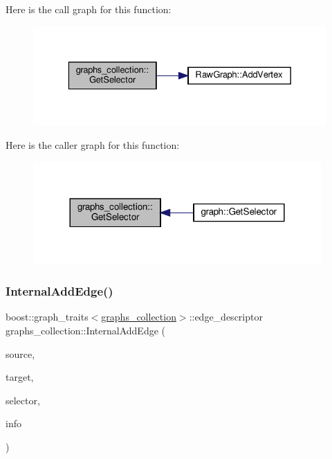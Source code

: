 Here is the call graph for this function\+:
\nopagebreak
\begin{figure}[H]
\begin{center}
\leavevmode
\includegraphics[width=329pt]{d8/d8d/structgraphs__collection_a99d8a722a7c4690f13a3a026f452c6c6_cgraph}
\end{center}
\end{figure}
Here is the caller graph for this function\+:
\nopagebreak
\begin{figure}[H]
\begin{center}
\leavevmode
\includegraphics[width=312pt]{d8/d8d/structgraphs__collection_a99d8a722a7c4690f13a3a026f452c6c6_icgraph}
\end{center}
\end{figure}
\mbox{\label{structgraphs__collection_a93b6975b6ecad6fa56ff112eaeb39270}} 
\subsubsection{\texorpdfstring{Internal\+Add\+Edge()}{InternalAddEdge()}}
{\footnotesize\ttfamily boost\+::graph\+\_\+traits$<$\hyperlink{structgraphs__collection}{graphs\+\_\+collection}$>$\+::edge\+\_\+descriptor graphs\+\_\+collection\+::\+Internal\+Add\+Edge (\begin{DoxyParamCaption}\item[{boost\+::graph\+\_\+traits$<$ \hyperlink{structgraphs__collection}{graphs\+\_\+collection} $>$\+::vertex\+\_\+descriptor}]{source,  }\item[{boost\+::graph\+\_\+traits$<$ \hyperlink{structgraphs__collection}{graphs\+\_\+collection} $>$\+::vertex\+\_\+descriptor}]{target,  }\item[{const int}]{selector,  }\item[{const \hyperlink{edge__info_8hpp_a65ddc964b1738667fc720f0de33aeef9}{Edge\+Info\+Ref}}]{info }\end{DoxyParamCaption})\hspace{0.3cm}{\ttfamily [inline]}}



